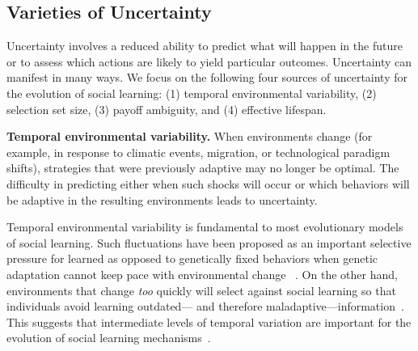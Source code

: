 \documentclass[letterpaper,11.5pt]{scrartcl}
\newcommand{\mt}[1]{{\textcolor{myorange} {({\tiny MT:} #1)}}}
\begin{document}

\subsection{Varieties of Uncertainty}

Uncertainty involves a reduced ability to predict what will happen in the future or to assess which actions are likely to yield particular outcomes. Uncertainty can manifest in many ways. We focus on the following four sources of uncertainty for the evolution of social learning: (1) temporal environmental variability, (2) selection set size, (3) payoff ambiguity, and (4) effective lifespan.

\textbf{Temporal environmental variability.} When environments change
(for example, in response to climatic events, migration, or technological paradigm shifts),
strategies that were previously adaptive may no longer be optimal. The difficulty
in predicting either when such shocks will occur or which behaviors will be
adaptive in the resulting environments leads to uncertainty. 

Temporal environmental variability is fundamental to most evolutionary models of
social learning. Such fluctuations have been proposed as an important selective
pressure for learned as opposed to genetically fixed behaviors when genetic adaptation cannot keep pace with environmental change 
~\cite{Richerson2000}. On the other hand, environments that change \emph{too} quickly
will select against social learning so that individuals avoid learning outdated--- 
and therefore maladaptive---information~\cite{Feldman1996,
BoydRicherson1985}. This suggests that intermediate levels of temporal variation
are important for the evolution of social learning mechanisms~\cite{aoki2005}.
\end{document}
